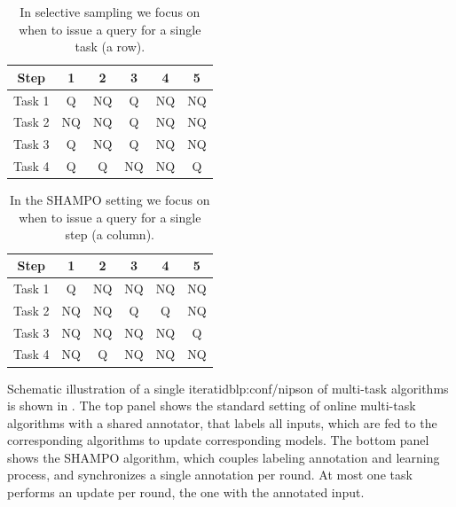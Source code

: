 \begin{table}[htp]
\begin{center}
{
\centering
\begin{tabular}{|c c c c c c|} \hline
 Step &	1 &	2 &	3 &	4 &	5 \\  \hline
 Task 1 &	Q      &	NQ &	Q &	NQ &	NQ \\ \hline
 Task 2 &	NQ   &	NQ &	Q &	NQ &	NQ \\ \hline
 Task 3 &	Q      &	 NQ &	Q &	NQ &	NQ \\ \hline
 Task 4 &	Q      &	Q &	NQ &	NQ &	Q \\ \hline
\end{tabular}
}
\end{center}
\caption{In selective sampling we focus on when to issue a query for a single task (a row).}
\label{tab:multitask_selective_sampling_example}
\end{table}

\begin{table}[htp]
\begin{center}
{
\centering
\begin{tabular}{|c c c c c c|} \hline
 Step &	1 &	2 &	3 &	4 &	5 \\  \hline
 Task 1 &	Q &	  NQ &	NQ &	NQ &	NQ \\ \hline
 Task 2 &	NQ &	NQ &	Q &	Q &	NQ \\ \hline
 Task 3 &	NQ &	 NQ &	NQ &	NQ &	Q \\ \hline
 Task 4 &	NQ &	Q &	NQ &	NQ &	NQ \\ \hline
\end{tabular}
}
\end{center}
\label{tab:multitask_SHAMPO_example} 
\caption{ In the SHAMPO setting we focus on when to issue a query for a single step (a column).}
\end{table}


Schematic illustration of a single iteratidblp:conf/nipson of multi-task algorithms is shown in . 
The top panel shows the standard setting of online multi-task algorithms with a shared annotator, that 
labels all inputs, which are fed to the corresponding algorithms to update corresponding models. The
bottom panel shows the SHAMPO algorithm, which couples labeling
annotation and learning process, and synchronizes a single annotation
per round.  At most one task performs an update per round, the one
with the annotated input.

